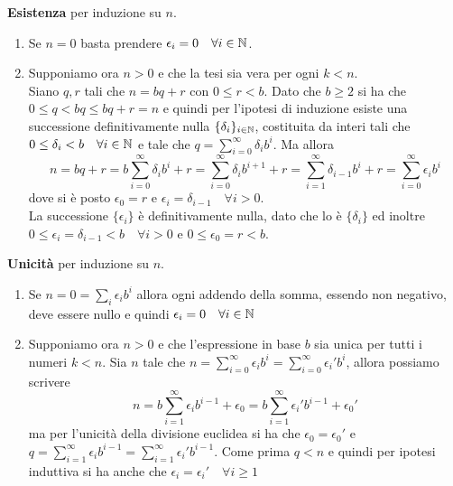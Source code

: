\documentclass[a4paper,12pt]{article}
\begin{document}
{
	\textbf{Esistenza} per induzione su $ n $.
	\begin{enumerate}
		\item Se $ n = 0 $ basta prendere $ \epsilon_{i} = 0 \quad \forall i \in \mathbb{N} $.
		\item Supponiamo ora $ n > 0 $ e che la tesi sia vera per ogni $ k < n $.\\
		Siano $ q, r $ tali che $ n = bq + r $ con $ 0 \leq r < b $. Dato che $ b \geq 2 $ si ha che $ 0 \leq q < bq \leq bq +r = n $ e quindi per l'ipotesi di induzione esiste una successione definitivamente nulla $ \{\delta_{i}\}_{i \in \mathbb{N}} $, costituita da interi tali che $ 0 \leq \delta_{i} < b \quad \forall i \in \mathbb{N} $ e tale che $ q = \sum_{i = 0}^{\infty} \delta_{i}b^{i} $. Ma allora
		\[ n = bq + r = b \sum_{i = 0}^\infty \delta_{i}b^i + r = \sum_{i = 0}^\infty \delta_{i}b^{i+1} + r = \sum_{i = 1}^\infty \delta_{i-1}b^i + r = \sum_{i = 0}^\infty \epsilon_{i}b^i \]
		dove si è posto $ \epsilon_{0} = r $ e $ \epsilon_{i} = \delta_{i-1} \quad \forall i > 0 $.\\
		La successione $ \{ \epsilon_{i} \} $ è definitivamente nulla, dato che lo è $ \{\delta_{i}\} $ ed inoltre $ 0 \leq \epsilon_{i} = \delta_{i-1} < b \quad \forall i > 0 $ e $ 0 \leq \epsilon_{0} = r < b $.
	\end{enumerate}
	\textbf{Unicità} per induzione su $ n $.
	\begin{enumerate}
		\item Se $ n = 0 = \sum_i \epsilon_ib^i $ allora ogni addendo della somma, essendo non negativo, deve essere nullo e quindi $ \epsilon_{i} = 0 \quad \forall i \in \mathbb{N} $
		\item Supponiamo ora $ n > 0 $ e che l'espressione in base $ b $ sia unica per tutti i numeri $ k < n $. Sia $ n $ tale che $ n = \sum_{i = 0}^{\infty} \epsilon_ib^i = \sum_{i = 0}^{\infty} \epsilon_i'b^i $, allora possiamo scrivere
		\[ n = b\sum_{i = 1}^\infty \epsilon_ib^{i-1} + \epsilon_{0} = b\sum_{i = 1}^\infty \epsilon_i'b^{i-1} + \epsilon_{0}' \]
		ma per l'unicità della divisione euclidea si ha che $ \epsilon_{0} = \epsilon_{0}' $ e $ q = \sum_{i = 1}^\infty \epsilon_ib^{i-1} = \sum_{i = 1}^\infty \epsilon_i'b^{i-1} $. Come prima $ q < n $ e quindi per ipotesi induttiva si ha anche che $ \epsilon_i = \epsilon_i' \quad \forall i \geq 1 $
	\end{enumerate}
}
\end{document}

